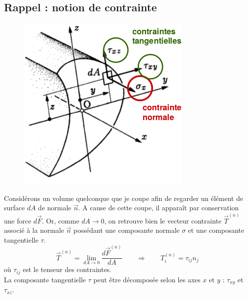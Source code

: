	\subsection{Rappel : notion de contrainte}
	\begin{figure}
	\vspace{-5mm}
	\includegraphics[scale=0.35]{ch2/image5.png}
	\end{figure}
	Considérons un volume quelconque que je coupe afin de regarder un 
	élément de surface $dA$ de normale $\vec{n}$. A cause de cette 
	coupe, il apparaît par conservation une force $d\vec{F}$. Or, comme 
	$dA\rightarrow0$, on retrouve bien le vecteur contrainte $\vec{T}^{
	(n)}$ associé à la normale $\vec{n}$ possédant une composante 
	normale $\sigma$ et une composante tangentielle $\tau$.
	\begin{equation}
	\vec{T}^{(n)} = \lim\limits_{dA\rightarrow0} \dfrac{d\vec{F}^{(n)}}{
	dA}\qquad\Longrightarrow\qquad T_i^{(n)} = \tau_{ij}n_j
	\end{equation}
	où $\tau_{ij}$ est le tenseur des contraintes.\\
	La composante tangentielle $\tau$ peut être décomposée selon les 
	axes $x$ et $y$ : $\tau_{xy}$ et $\tau_{xz}$.
	
